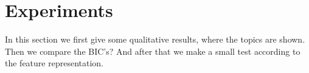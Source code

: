 \documentclass[11pt,a4paper]{article}
\begin{document}
% 

\pagebreak

\section{Experiments}
\label{sec:Experiments}
In this section we first give some qualitative results, where the topics are shown. Then we compare the BIC's?
And after that we make a small test according to the feature representation.


\end{document}
